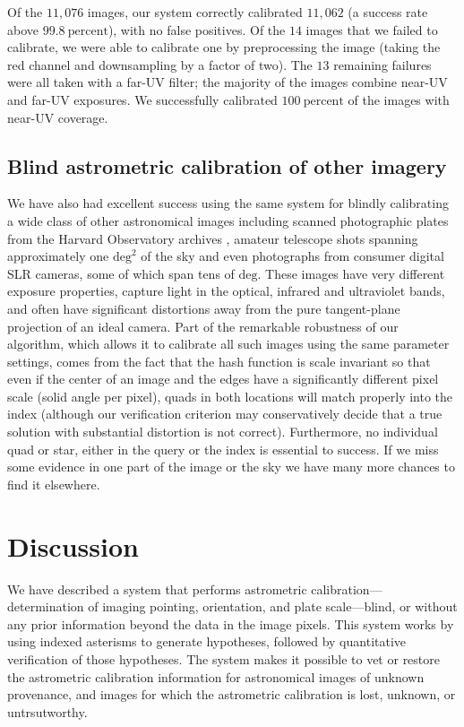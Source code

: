 \documentclass[12pt,preprint]{aastex}
\newcommand{\unit}[1]{\mathrm{#1}}
\newcommand{\percent}{\unit{percent}}
\renewcommand{\%}{\percent}
\renewcommand{\deg}{\unit{deg}}
\begin{document}

Of the $11,076$ images, our system correctly calibrated $11,062$ (a
success rate above $99.8~\%$), with no false positives.  Of the $14$
images that we failed to calibrate, we were able to calibrate one by
preprocessing the image (taking the red channel and downsampling by a
factor of two).  The $13$ remaining failures were all taken with a
far-UV filter; the majority of the images combine near-UV and far-UV
exposures.  We successfully calibrated $100~\percent$ of the images
with near-UV coverage.

\subsection{Blind astrometric calibration of other imagery}

We have also had excellent success using the same system for blindly
calibrating a wide class of other astronomical images including
scanned photographic plates from the Harvard Observatory archives
\citep{harvardplates}, amateur telescope shots spanning approximately
one $\deg^2$ of the sky and even photographs from consumer
digital SLR cameras, some of which span tens of $\deg$. These images
have very different exposure properties, capture light in the optical,
infrared and ultraviolet bands, and often have significant distortions
away from the pure tangent-plane projection of an ideal camera. Part
of the remarkable robustness of our algorithm, which allows it to
calibrate all such images using the same parameter settings, comes
from the fact that the hash function is scale invariant so that even
if the center of an image and the edges have a significantly different
pixel scale (solid angle per pixel), quads in both locations will
match properly into the index (although our verification criterion may
conservatively decide that a true solution with substantial distortion
is not correct). Furthermore, no individual quad or star, either in
the query or the index is essential to success. If we miss some
evidence in one part of the image or the sky we have many more chances
to find it elsewhere.

\section{Discussion}

We have described a system that performs astrometric
calibration---determination of imaging pointing, orientation, and
plate scale---blind, or without any prior information beyond the data
in the image pixels.  This system works by using indexed asterisms to
generate hypotheses, followed by quantitative verification of those
hypotheses.  The system makes it possible to vet or restore the
astrometric calibration information for astronomical images of unknown
provenance, and images for which the astrometric calibration is lost,
unknown, or untrsutworthy.
\end{document}
